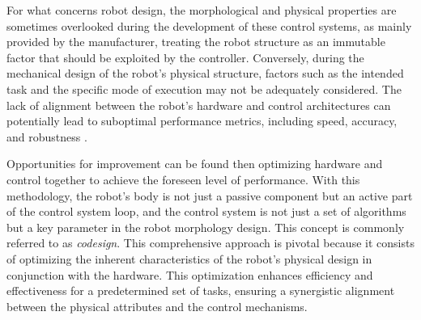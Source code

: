 For what concerns robot design, the morphological and physical properties are sometimes overlooked during the development of these control systems, as mainly provided by the manufacturer, treating the robot structure as an immutable factor that should be exploited by the controller. Conversely, during the mechanical design of the robot's physical structure, factors such as the intended task and the specific mode of execution may not be adequately considered. The lack of alignment between the robot's hardware and control architectures can potentially lead to suboptimal performance metrics, including speed, accuracy, and robustness \citep{sorokin_designing_2023}.

Opportunities for improvement can be found then optimizing hardware and control together to achieve the foreseen level of performance. With this methodology, the robot's body is not just a passive component but an active part of the control system loop, and the control system is not just a set of algorithms but a key parameter in the robot morphology design. This concept is commonly referred to as \textit{codesign}. This comprehensive approach is pivotal because it consists of optimizing the inherent characteristics of the robot's physical design in conjunction with the hardware. This optimization enhances efficiency and effectiveness for a predetermined set of tasks, ensuring a synergistic alignment between the physical attributes and the control mechanisms.

